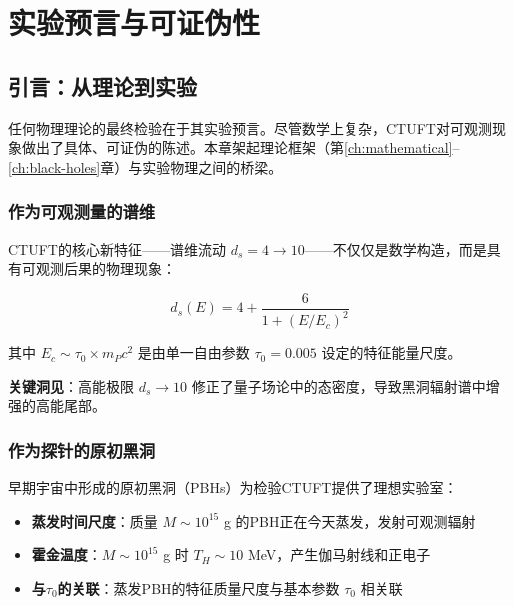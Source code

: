 \chapter{实验预言与可证伪性}
\label{ch:experimental}

\begin{abstract}
本章介绍Clifford-扭转统一场论（CTUFT）的具体、实验上可检验的预言。我们关注原初黑洞（PBH）霍金辐射作为理论谱维流动 $d_s \to 10$ 的探针。推导出五个具体的可证伪预言，范围从CTA（2025+）可探测的伽马射线谱修正到LISA（2030年代）可观测的引力波信号。这些预言确立CTUFT为物理上可检验的框架，而非纯粹的理论构造。
\end{abstract}

\section{引言：从理论到实验}
\label{sec:exp-intro}

任何物理理论的最终检验在于其实验预言。尽管数学上复杂，CTUFT对可观测现象做出了具体、可证伪的陈述。本章架起理论框架（第\ref{ch:mathematical}--\ref{ch:black-holes}章）与实验物理之间的桥梁。

\subsection{作为可观测量的谱维}
\label{subsec:spectral-observable}

CTUFT的核心新特征——谱维流动 $d_s = 4 \to 10$——不仅仅是数学构造，而是具有可观测后果的物理现象：

\begin{equation}
d_s(E) = 4 + \frac{6}{1 + (E/E_c)^2}
\label{eq:spectral-flow-exp}
\end{equation}

其中 $E_c \sim \tau_0 \times m_P c^2$ 是由单一自由参数 $\tau_0 = 0.005$ 设定的特征能量尺度。

\textbf{关键洞见}：高能极限 $d_s \to 10$ 修正了量子场论中的态密度，导致黑洞辐射谱中增强的高能尾部。

\subsection{作为探针的原初黑洞}
\label{subsec:pbh-probes}

早期宇宙中形成的原初黑洞（PBHs）为检验CTUFT提供了理想实验室：

\begin{itemize}
    \item \textbf{蒸发时间尺度}：质量 $M \sim 10^{15}$ g 的PBH正在今天蒸发，发射可观测辐射
    \item \textbf{霍金温度}：$M \sim 10^{15}$ g 时 $T_H \sim 10$ MeV，产生伽马射线和正电子
    \item \textbf{与}$\tau_0$\textbf{的关联}：蒸发PBH的特征质量尺度与基本参数 $\tau_0$ 相关联
\end{itemize}


